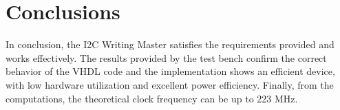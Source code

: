 
\chapter{Conclusions}

In conclusion, the I2C Writing Master satisfies the requirements provided and works effectively. The results provided by the test bench confirm the correct behavior of the VHDL code and the implementation shows an efficient device, with low hardware utilization and excellent power efficiency. Finally, from the computations, the theoretical clock frequency can be up to 223 MHz.